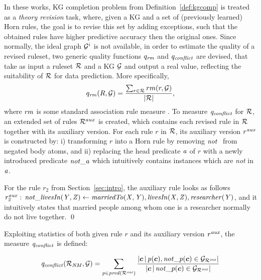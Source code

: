 In these works, KG completion problem from Definition~\ref{def:kgcomp} is treated 
as a \emph{theory revision} task, where, given a KG and a set of (previously learned) Horn rules, the goal is to revise this set by adding exceptions, such that the obtained rules have higher predictive accuracy then the original ones. Since normally, the ideal graph $\mathcal{G}^i$ is not available, in order to estimate the quality of a
revised ruleset, two generic quality functions $q_{\mathit{rm}}$ and
$q_{\mathit{conflict}}$ are devised, that take as input a ruleset $\mathcal{R}$ and a KG $\mathcal{G}$ and output a
real value, reflecting the suitability of $\mathcal{R}$ for data prediction.  More
specifically, \begin{equation}q_{\mathit{rm}} (R,\mathcal{G})=\dfrac{\sum_{r\in
    \mathcal{R}}rm(r,\mathcal{G})}{|\mathcal{R}|}, \end{equation} where $\mathit{rm}$ is some standard
association rule measure \cite{Azevedo2007}. To measure $\mathit{q_{conflict}}$ for
$\mathcal{R}$, an extended set of rules $\mathcal{R}^{aux}$ is created, which contains each %
revised rule in $\mathcal{R}$ %
together with %
its auxiliary version. For each rule $r$ in $\mathcal{R}$,
its auxiliary version $r^{\mathit{aux}}$ is constructed by: i) transforming $r$ into a Horn rule by
removing %
$\naf$ from negated body atoms, %
and ii) replacing the head
predicate $\mathit{a}$ of $r$ %
with a newly introduced predicate $\mathit{not\_a}$ which intuitively contains %
instances which are \emph{not} in $\mathit{a}$. 

\begin{example} For the rule $r_2$ from Section~\ref{sec:intro}, the auxiliary rule looks as follows $\mathit{r_2^{aux}:\,not\_livesIn(Y,Z)\leftarrow marriedTo(X,Y),livesIn(X,Z),researcher(Y)}$, and it intuitively states that married people among whom one is a researcher normally do not live together. \qed
\end{example}


Exploiting statistics of both given rule $r$ and its auxiliary version $\mathit{r^{aux}}$, the measure $\mathit{q_{conflict}}$ is defined:

\begin{equation}
\mi{q_{conflict}(\cR_{\mi{NM}},\cG)=\sum_{p\in pred(\cR^{\mi{aux}})} \dfrac{|\vec{c}\,|\,p(\vec{c}),not\_p(\vec{c})\in \cG_{\cR^{\mi{aux}}}|}{|\vec{c}\,|\,not\_p(\vec{c})\in \cG_{\cR^{\mi{aux}}}|}}
\end{equation}

